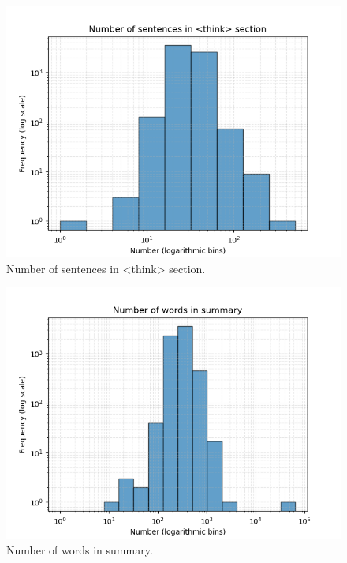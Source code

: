 \documentclass[conference]{IEEEtran}
\begin{document}
    \begin{figure}[htbp]
        \centerline{\includegraphics[width=\linewidth]{"./Number of sentences in <think> section.png"}}
        \caption{Number of sentences in <think> section.}
        \label{fig}
        \end{figure}

        \begin{figure}[htbp]
            \centerline{\includegraphics[width=\linewidth]{"./Number of words in summary.png"}}
            \caption{Number of words in summary.}
            \label{fig}
            \end{figure}
\end{document}
